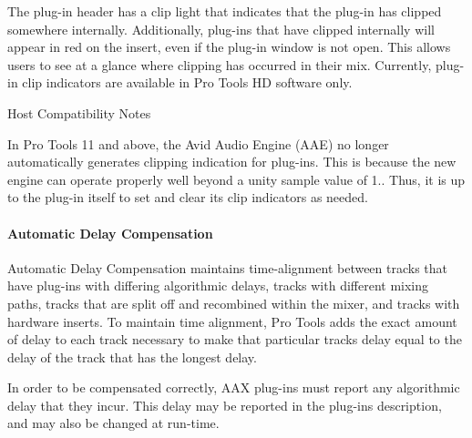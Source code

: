 \begin{DoxyItemize}
The plug-\/in header has a clip light that indicates that the plug-\/in has clipped somewhere internally. Additionally, plug-\/ins that have clipped internally will appear in red on the insert, even if the plug-\/in window is not open. This allows users to see at a glance where clipping has occurred in their mix. Currently, plug-\/in clip indicators are available in Pro Tools H\+D software only.

\begin{DoxyRefDesc}{Host Compatibility Notes}
\item[\hyperlink{a00380__compatibility_notes000013}{Host Compatibility Notes}]In Pro Tools 11 and above, the Avid Audio Engine (A\+A\+E) no longer automatically generates clipping indication for plug-\/ins. This is because the new engine can operate properly well beyond a unity sample value of 1.. Thus, it is up to the plug-\/in itself to set and clear its clip indicators as needed.\end{DoxyRefDesc}





\end{DoxyItemize}

\hypertarget{a00360_subsubsection__automatic_delay_compensation_}{}\paragraph{Automatic Delay Compensation}\label{a00360_subsubsection__automatic_delay_compensation_}
 Automatic Delay Compensation maintains time-\/alignment between tracks that have plug-\/ins with differing algorithmic delays, tracks with different mixing paths, tracks that are split off and recombined within the mixer, and tracks with hardware inserts. To maintain time alignment, Pro Tools adds the exact amount of delay to each track necessary to make that particular track\textquotesingle{}s delay equal to the delay of the track that has the longest delay.

In order to be compensated correctly, A\+A\+X plug-\/ins must report any algorithmic delay that they incur. This delay may be reported in the plug-\/in\textquotesingle{}s description, and may also be changed at run-\/time.

